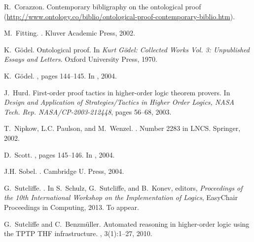 \documentclass{easychair}
\begin{document}
\begin{thebibliography}{10}
R.~Corazzon.
\newblock Contemporary bibligraphy on the ontological proof
  (\url{http://www.ontology.co/biblio/ontological-proof-contemporary-biblio.htm}).

M.~Fitting.
.
\newblock Kluver Academic Press, 2002.

K.~G\"odel.
\newblock Ontological proof.
\newblock In {\em {Kurt G\"odel: Collected Works Vol. 3: Unpublished Essays and
  Letters}}. Oxford University Press, 1970.

K.~G\"odel.
, pages 144--145.
\newblock In  \cite{sobel2004logic}, 2004.

J.~Hurd.
\newblock First-order proof tactics in higher-order logic theorem provers.
\newblock In {\em Design and Application of Strategies/Tactics in Higher Order
  Logics, NASA Tech. Rep. NASA/CP-2003-212448}, pages 56--68, 2003.

T.~Nipkow, L.C. Paulson, and M.~Wenzel.
.
\newblock Number 2283 in LNCS. Springer, 2002.

D.~Scott.
, pages 145--146.
\newblock In  \cite{sobel2004logic}, 2004.

J.H. Sobel.
.
\newblock Cambridge U. Press, 2004.

G.~Sutcliffe.
.
\newblock In S.~Schulz, G.~Sutcliffe, and B.~Konev, editors, {\em {Proceedings
  of the 10th International Workshop on the Implementation of Logics}},
  EasyChair Proceedings in Computing, 2013.
\newblock To appear.

G.~Sutcliffe and C.~Benzm{\"u}ller.
\newblock Automated reasoning in higher-order logic using the {TPTP THF}
  infrastructure.
, 3(1):1--27, 2010.

\end{thebibliography}
\end{document}
